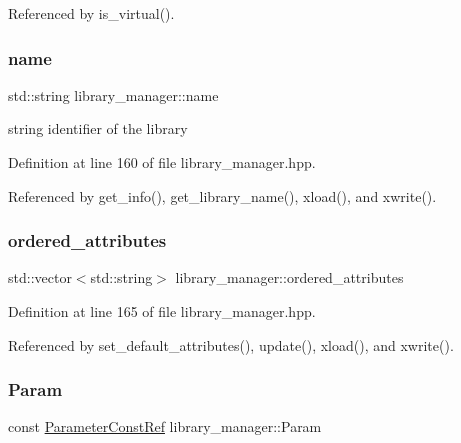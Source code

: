 Referenced by is\+\_\+virtual().

\mbox{\label{classlibrary__manager_a6d92e10c68ec4a2975d832b0650c7168}} 
\subsubsection{\texorpdfstring{name}{name}}
{\footnotesize\ttfamily std\+::string library\+\_\+manager\+::name\hspace{0.3cm}{\ttfamily [private]}}



string identifier of the library 



Definition at line 160 of file library\+\_\+manager.\+hpp.



Referenced by get\+\_\+info(), get\+\_\+library\+\_\+name(), xload(), and xwrite().

\mbox{\label{classlibrary__manager_ae96defe4ac96f8ce7d5c336e3b7a3adb}} 
\subsubsection{\texorpdfstring{ordered\+\_\+attributes}{ordered\_attributes}}
{\footnotesize\ttfamily std\+::vector$<$std\+::string$>$ library\+\_\+manager\+::ordered\+\_\+attributes\hspace{0.3cm}{\ttfamily [private]}}



Definition at line 165 of file library\+\_\+manager.\+hpp.



Referenced by set\+\_\+default\+\_\+attributes(), update(), xload(), and xwrite().

\mbox{\label{classlibrary__manager_a456f9321dfda42ab5d48c9636ab43320}} 
\subsubsection{\texorpdfstring{Param}{Param}}
{\footnotesize\ttfamily const \hyperlink{Parameter_8hpp_a37841774a6fcb479b597fdf8955eb4ea}{Parameter\+Const\+Ref} library\+\_\+manager\+::\+Param\hspace{0.3cm}{\ttfamily [private]}}



